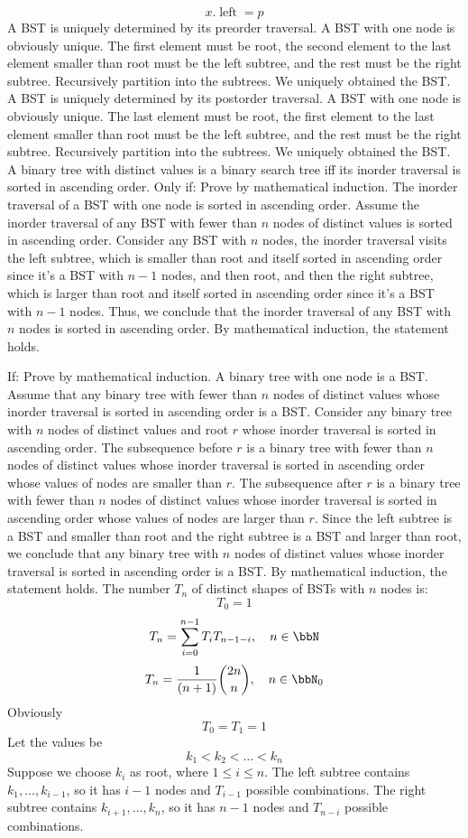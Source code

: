 \documentclass[a4paper,12pt]{article}
\begin{document}
\[x.\operatorname{left}=p\]
\eit
{}
A BST is uniquely determined by its preorder traversal.
\bpr
A BST with one node is obviously unique. The first element must be root, the second element to the last element smaller than root must be the left subtree, and the rest must be the right subtree. Recursively partition into the subtrees. We uniquely obtained the BST.
\epr
{}
A BST is uniquely determined by its postorder traversal.
\bpr
A BST with one node is obviously unique. The last element must be root, the first element to the last element smaller than root must be the left subtree, and the rest must be the right subtree. Recursively partition into the subtrees. We uniquely obtained the BST.
\epr
{}
A binary tree with distinct values is a binary search tree iff its inorder traversal is sorted in ascending order.
\bpr
Only if: Prove by mathematical induction. The inorder traversal of a BST with one node is sorted in ascending order. Assume the inorder traversal of any BST with fewer than $n$ nodes of distinct values is sorted in ascending order. Consider any BST with $n$ nodes, the inorder traversal visits the left subtree, which is smaller than root and itself sorted in ascending order since it's a BST with $n-1$ nodes, and then root, and then the right subtree, which is larger than root and itself sorted in ascending order since it's a BST with $n-1$ nodes. Thus, we conclude that the inorder traversal of any BST with $n$ nodes is sorted in ascending order. By mathematical induction, the statement holds.

If: Prove by mathematical induction. A binary tree with one node is a BST. Assume that any binary tree with fewer than $n$ nodes of distinct values whose inorder traversal is sorted in ascending order is a BST. Consider any binary tree with $n$ nodes of distinct values and root $r$ whose inorder traversal is sorted in ascending order. The subsequence before $r$ is a binary tree with fewer than $n$ nodes of distinct values whose inorder traversal is sorted in ascending order whose values of nodes are smaller than $r$. The subsequence after $r$ is a binary tree with fewer than $n$ nodes of distinct values whose inorder traversal is sorted in ascending order whose values of nodes are larger than $r$. Since the left subtree is a BST and smaller than root and the right subtree is a BST and larger than root, we conclude that any binary tree with $n$ nodes of distinct values whose inorder traversal is sorted in ascending order is a BST. By mathematical induction, the statement holds.
\epr
{}
The number $T_n$ of distinct shapes of BSTs with $n$ nodes is:
\[T_0=1\]
\[T_n=\sum_{i=0}^{n-1}T_iT_{n-1-i},\quad n\in\bbN\]
\[T_n=\frac{1}{(n+1)}\binom{2n}{n},\quad n\in\bbN_0\]
\bpr
Obviously
\[T_0=T_1=1\]
Let the values be
\[k_1<k_2<\ldots<k_n\]
Suppose we choose $k_i$ as root, where $1\le i\le n$. The left subtree contains $k_1,\ldots,k_{i-1}$, so it has $i-1$ nodes and $T_{i-1}$ possible combinations. The right subtree contains $k_{i+1},\ldots,k_n$, so it has $n-1$ nodes and $T_{n-i}$ possible combinations.
\end{document}
